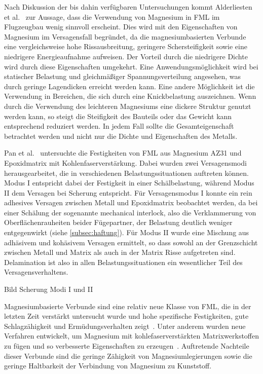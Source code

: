 Nach Diskussion der bis dahin verfügbaren Untersuchungen kommt Alderliesten et al.~\cite{Alderliesten2008} zur Aussage, dass die Verwendung von Magnesium in FML im Flugzeugbau wenig sinnvoll erscheint.
Dies wird mit den Eigenschaften von Magnesium im Versagensfall begründet, da die magnesiumbasierten Verbunde eine vergleichsweise hohe Rissausbreitung, geringere Schersteifigkeit sowie eine niedrigere Energieaufnahme aufweisen.
Der Vorteil durch die niedrigere Dichte wird durch diese Eigenschaften umgekehrt.
Eine Anwendungsmöglichkeit wird bei statischer Belastung und gleichmäßiger Spannungsverteilung angesehen, was durch geringe Lagendicken erreicht werden kann.
Eine andere Möglichkeit ist die Verwendung in Bereichen, die sich durch eine Knickbelastung auszeichnen.
Wenn durch die Verwendung des leichteren Magnesiums eine dickere Struktur genutzt werden kann, so steigt die Steifigkeit des Bauteils oder das Gewicht kann entsprechend reduziert werden.
In jedem Fall sollte die Gesamteigenschaft betrachtet werden und nicht nur die Dichte und Eigenschaften des Metalls.\cite{Alderliesten2008}

Pan et al.~\cite{Pan2016} untersuchte die Festigkeiten von FML aus Magnesium AZ31 und Epoxidmatrix mit Kohlenfaserverstärkung.
Dabei wurden zwei Versagensmodi herausgearbeitet, die in verschiedenen Belastungssituationen auftreten können.
Modus I entspricht dabei der Festigkeit in einer Schälbelastung, während Modus II dem Versagen bei Scherung entspricht.
Für Versagensmodus I konnte ein rein adhesives Versagen zwischen Metall und Epoxidmatrix beobachtet werden, da bei einer Schälung der sogenannte mechanical interlock, also die Verklammerung von Oberflächenrauheiten beider Fügepartner, der Belastung deutlich weniger entgegenwirkt (siehe \autoref{subsec:haftung}).
Für Modus II wurde eine Mischung aus adhäsivem und kohäsivem Versagen ermittelt, so dass sowohl an der Grenzschicht zwischen Metall und Matrix als auch in der Matrix Risse aufgetreten sind.
Delamination ist also in allen Belastungssituationen ein wesentlicher Teil des Versagensverhaltens.

Bild Scherung Modi I und II

Magnesiumbasierte Verbunde sind eine relativ neue Klasse von FML, die in der letzten Zeit verstärkt untersucht wurde und hohe spezifische Festigkeiten, gute Schlagzähigkeit und Ermüdungsverhalten zeigt~\cite{Cicco2019}.
Unter anderem wurden neue Verfahren entwickelt, um Magnesium mit kohlefaserverstärkten Matrixwerkstoffen zu fügen und so verbesserte Eigenschaften zu erzeugen~\cite{Pan2017c}.
Auftretende Nachteile dieser Verbunde sind die geringe Zähigkeit von Magnesiumlegierungen sowie die geringe Haltbarkeit der Verbindung von Magnesium zu Kunststoff.


